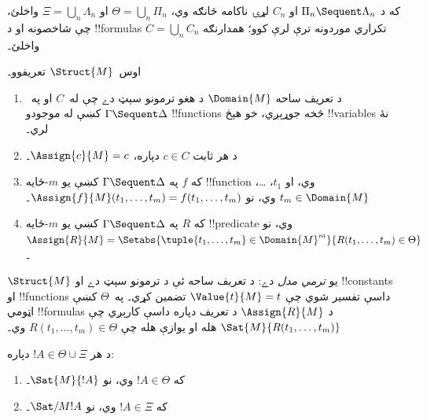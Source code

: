 \documentclass[../../../include/open-logic-section]{subfiles}
\begin{document}
که د $\Pi_n \Sequent \Lambda_n$ او $C_n$ لړۍ ناکامه څانګه
وي، $\Theta = \bigcup_n \Pi_n$ او $\Xi = \bigcup_n \Lambda_n$
واخلئ، چې شاخصونه او د !!{formula}s تکراري موردونه ترې لرې
کوو؛ همدارنګه $C = \bigcup_n C_n$ واخلئ۔

اوس~$\Struct{M}$ تعريفوو۔
\begin{enumerate}
\item د تعريف ساحه $\Domain{M}$ د هغو ترمونو سېټ دے چې له~$C$
او په~$\Gamma \Sequent \Delta$ کښې له موجودو !!{function}s
څخه جوړېږي، خو هېڅ !!{variable}s نۀ لري۔
\item د هر ثابت $c \in C$ دپاره، $\Assign{c}{M} = c$۔
\item که $f$ په $\Gamma \Sequent \Delta$ کښې يو $m$-ځايه
!!{function} وي، او $t_1$، \dots، $t_m \in \Domain{M}$ وي، نو
$\Assign{f}{M}(t_1, \dots, t_m) = f(t_1, \dots, t_m)$۔
\item که $R$ په $\Gamma \Sequent \Delta$ کښې يو $m$-ځايه
!!{predicate} وي، نو $\Assign{R}{M} = \Setabs{\tuple{t_1, \dots, t_m} \in
\Domain{M}^m}{R(t_1, \dots, t_m) \in \Theta}$۔
\end{enumerate}
$\Struct{M}$ يو \emph{ترمي مدل} دے: د تعريف ساحه ئې د ترمونو
سېټ دے او !!{constant}s او !!{function}s داسې تفسير شوي چې
$\Value{t}{M} = t$ تضمين کړي۔ په~$\Theta$ کښې اټومي
!!{formula}s د $\Assign{R}{M}$ د تعريف دپاره داسې کارېږي چې
$\Sat{M}{R(t_1, \dots, t_m)}$ هله او يوازې هله چې
$R(t_1, \dots, t_m) \in \Theta$ وي۔

\begin{lem}
د هر $!A \in \Theta \cup \Xi$ دپاره:
\begin{enumerate}
  \item که $!A \in \Theta$ وي، نو $\Sat{M}{!A}$۔
  \item که $!A \in \Xi$ وي، نو $\Sat/{M}{!A}$۔
\end{enumerate}
\end{lem}
\end{document}
